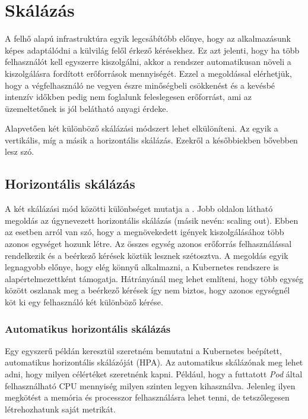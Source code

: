 \section{Skálázás}
A felhő alapú infrastruktúra egyik legcsábítóbb előnye, hogy az alkalmazásunk képes adaptálódni a külvilág felől érkező kérésekhez. Ez azt jelenti, hogy ha több felhasználót kell egyszerre kiszolgálni, akkor a rendszer automatikusan növeli a kiszolgálásra fordított erőforrások mennyiségét. Ezzel a megoldással elérhetjük, hogy a végfelhasználó ne vegyen észre minőségbeli csökkenést és a kevésbé intenzív időkben pedig nem foglalunk feleslegesen erőforrást, ami az üzemeltetőnek is jól belátható anyagi érdeke.
 
Alapvetően két különböző skálázási módszert lehet elkülöníteni. Az egyik a vertikális, míg a másik a horizontális skálázás. Ezekről a későbbiekben bővebben lesz szó. 

\subsection{Horizontális skálázás}
A két skálázási mód közötti különbséget mutatja a . Jobb oldalon látható megoldás az úgynevezett horizontális skálázás (másik nevén: scaling out). Ebben az esetben arról van szó, hogy a megnövekedett igények kiszolgálásához több azonos egységet hozunk létre. Az összes egység azonos erőforrás felhasználással rendelkezik és a beérkező kérések köztük lesznek szétosztva. 
A megoldás egyik legnagyobb előnye, hogy elég könnyű alkalmazni, a Kubernetes rendszere is alapértelmezettként támogatja. Hátrányánál meg lehet említeni, hogy több egység között oszlanak meg a beérkező kérések így nem biztos, hogy azonos egységnél köt ki egy felhasználó két különböző kérése. 

\subsubsection{Automatikus horizontális skálázás}
Egy egyszerű példán keresztül szeretném bemutatni a Kubernetes beépített, automatikus horizontális skálázóját (HPA). Az automatikus skálázónak meg lehet adni, hogy milyen célértéket szeretnénk kapni. Például, hogy a futtatott \textit{Pod} által felhasználható CPU mennyiség milyen szinten legyen kihasználva. Jelenleg ilyen megkötést a memória és processzor felhasználásra lehet tenni, de tetszőlegesen létrehozhatunk saját metrikát. 

